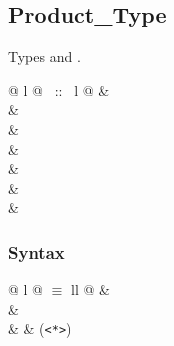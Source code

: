 \begin{isabellebody}
\begin{isamarkuptext}
\section{Product\_Type}

Types  and \isa{{\isasymtimes}}.

\begin{supertabular}{@ {} l @ {~::~} l @ {}}
\isa{{\isacharparenleft}{\isacharparenright}} & \\
 & \\
 & \\
 & \\
 & \\
 & \\
 & \\
\end{supertabular}

\subsubsection*{Syntax}

\begin{tabular}{@ {} l @ {\quad$\equiv$\quad} ll @ {}}
 & \\
 & \\
 &   & (\verb$<*>$)
\end{tabular}


\end{isamarkuptext}
\end{isabellebody}
